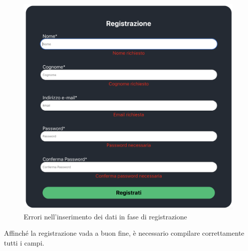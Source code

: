 \begin{figure}[H]
\centering
\includegraphics[scale=0.4]{./images/Registrazione/DatiErrati.png} 
\caption{Errori nell'inserimento dei dati in fase di registrazione}
\end{figure}

Affinché la registrazione vada a buon fine, è necessario compilare correttamente tutti i campi. 
